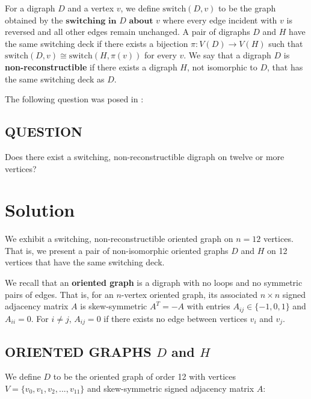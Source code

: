 \documentclass[11pt]{article}
\theoremstyle{definition}
\numberwithin{equation}{section}
\begin{document}
\begin{humanaiblock}
For a digraph $D$ and a vertex $v$, we define $\mathrm{switch}(D,v)$ to be the graph obtained by the $\textbf{switching in $D$ about $v$}$ where every edge incident with $v$ is reversed and all other edges remain unchanged. A pair of digraphs $D$ and $H$ have the same switching deck if there exists a bijection $\pi: V(D) \to V(H)$ such that $\mathrm{switch}(D,v) \cong \mathrm{switch}(H,\pi(v))$ for every $v$. We say that a digraph $D$ is \textbf{non-reconstructible} if there exists a digraph $H$, not isomorphic to $D$, that has the same switching deck as $D$.

The following question was posed in \cite{BondyMercier2011}: 

\subsection*{QUESTION} Does there exist a switching, non-reconstructible digraph on twelve or more vertices? 

\section{Solution}
We exhibit a switching, non-reconstructible oriented graph on $n=12$ vertices. That is, we present a pair of non-isomorphic oriented graphs $D$ and $H$ on 12 vertices that have the same switching deck. 

We recall that an \textbf{oriented graph} is a digraph with no loops and no symmetric pairs of edges. That is, for an $n$-vertex oriented graph, its associated $n \times n$ signed adjacency matrix $A$ is skew-symmetric $A^T = -A$ with entries $A_{ij} \in \{-1, 0, 1\}$ and $A_{ii} = 0$. For $i \neq j$, $A_{ij} = 0$ if there exists no edge between vertices $v_i$ and $v_j$.

\subsection*{ORIENTED GRAPHS $D$ and $H$} 
We define $D$ to be the oriented graph of order 12 with vertices $V = \{v_0,v_1,v_2,...,v_{11}\}$ and skew-symmetric signed adjacency
matrix $A$:


\end{humanaiblock}
\end{document}
